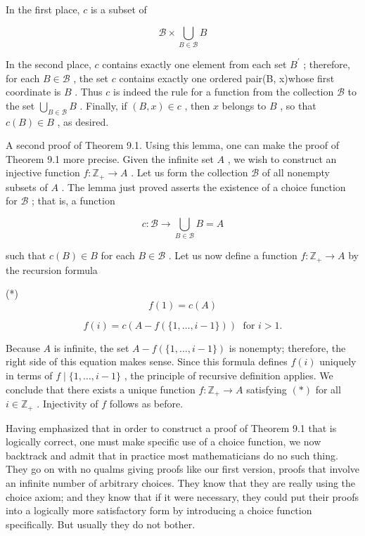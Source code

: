 In the first place, \(c\) is a subset of

\[
\mathcal{B} \times  \mathop{\bigcup }\limits_{{B \in  \mathcal{B}}}B
\]

In the second place, \(c\) contains exactly one element from each set \({B}^{\prime }\) ; therefore, for each \(B \in  \mathcal{B}\) , the set \(c\) contains exactly one ordered pair(B, x)whose first coordinate is \(B\) . Thus \(c\) is indeed the rule for a function from the collection \(\mathcal{B}\) to the set \(\mathop{\bigcup }\limits_{{B \in  \mathcal{B}}}B\) . Finally, if \(\left( {B,x}\right)  \in  c\) , then \(x\) belongs to \(B\) , so that \(c\left( B\right)  \in  B\) , as desired.

A second proof of Theorem 9.1. Using this lemma, one can make the proof of Theorem 9.1 more precise. Given the infinite set \(A\) , we wish to construct an injective function \(f : {\mathbb{Z}}_{ + } \rightarrow  A\) . Let us form the collection \(\mathcal{B}\) of all nonempty subsets of \(A\) . The lemma just proved asserts the existence of a choice function for \(\mathcal{B}\) ; that is, a function

\[
c : \mathcal{B} \rightarrow  \mathop{\bigcup }\limits_{{B \in  \mathcal{B}}}B = A
\]

such that \(c\left( B\right)  \in  B\) for each \(B \in  \mathcal{B}\) . Let us now define a function \(f : {\mathbb{Z}}_{ + } \rightarrow  A\) by the recursion formula

(*)
\[
f\left( 1\right)  = c\left( A\right)
\]

\[
f\left( i\right)  = c\left( {A - f\left( {\{ 1,\ldots ,i - 1\} }\right) }\right) \;\text{ for }i > 1.
\]

Because \(A\) is infinite, the set \(A - f\left( {\{ 1,\ldots ,i - 1\} }\right)\) is nonempty; therefore, the right side of this equation makes sense. Since this formula defines \(f\left( i\right)\) uniquely in terms of \(f \mid  \{ 1,\ldots ,i - 1\}\) , the principle of recursive definition applies. We conclude that there exists a unique function \(f : {\mathbb{Z}}_{ + } \rightarrow  A\) satisfying \(\left( *\right)\) for all \(i \in  {\mathbb{Z}}_{ + }\) . Injectivity of \(f\) follows as before.

Having emphasized that in order to construct a proof of Theorem 9.1 that is logically correct, one must make specific use of a choice function, we now backtrack and admit that in practice most mathematicians do no such thing. They go on with no qualms giving proofs like our first version, proofs that involve an infinite number of arbitrary choices. They know that they are really using the choice axiom; and they know that if it were necessary, they could put their proofs into a logically more satisfactory form by introducing a choice function specifically. But usually they do not bother.

